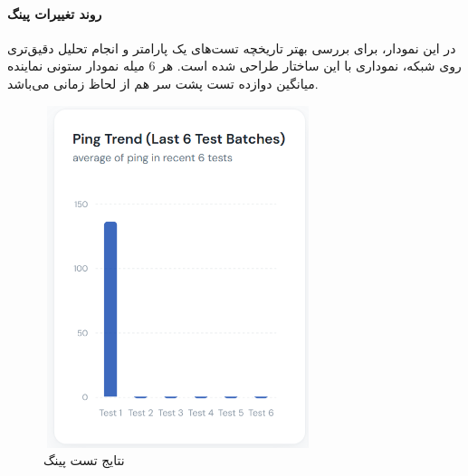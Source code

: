 \documentclass{report}
\begin{document}
\paragraph{روند تغییرات پینگ}
در این نمودار، برای بررسی بهتر تاریخچه تست‌های یک پارامتر و انجام تحلیل دقیق‌تری روی شبکه، نموداری با این ساختار طراحی شده است. هر 6 میله نمودار ستونی نماینده میانگین دوازده تست پشت سر هم از لحاظ زمانی می‌باشد.
 \begin{figure}[ht]
	\centering
	\includegraphics[width=0.7\textwidth,height=10cm,keepaspectratio]{Pic/ping}
	\caption{ نتایج تست پینگ}
	\label{fig:ping}
\end{figure}
\end{document}
